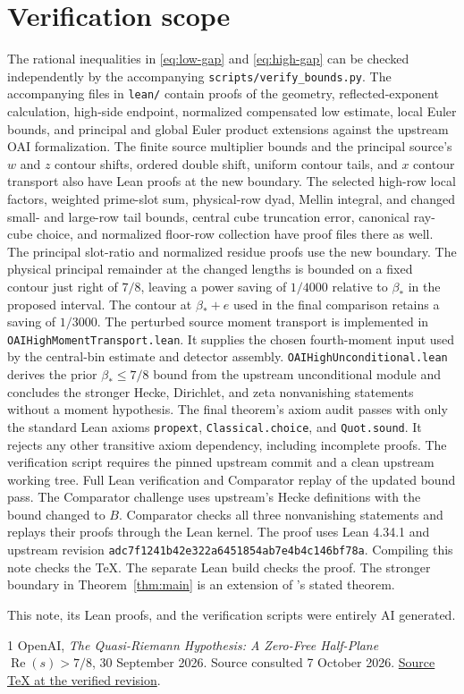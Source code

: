 \documentclass[11pt]{article}
\newcommand{\Ree}{\operatorname{Re}}
\begin{document}
\section*{Verification scope}

The rational inequalities in \eqref{eq:low-gap} and \eqref{eq:high-gap}
can be checked independently by the accompanying
\texttt{scripts/verify\_bounds.py}.
The accompanying files in \texttt{lean/} contain proofs of the geometry,
reflected-exponent calculation, high-side endpoint, normalized compensated
low estimate, local Euler bounds, and principal and global Euler product
extensions against the upstream OAI formalization.
The finite source multiplier bounds and
the principal source's $w$ and $z$ contour shifts, ordered double shift,
uniform contour tails, and $x$ contour transport also have Lean proofs at
the new boundary. The selected high-row local factors, weighted prime-slot
sum, physical-row dyad, Mellin integral, and changed small- and large-row
tail bounds, central cube truncation error, canonical ray-cube choice, and
normalized floor-row collection have proof files there as well.
The principal slot-ratio and normalized residue proofs use the
new boundary. The physical principal remainder at the changed lengths is
bounded on a fixed contour just right of $7/8$, leaving a power saving of
$1/4000$ relative to $\beta_*$ in the proposed interval. The contour at
$\beta_*+e$ used in the final comparison retains a saving of $1/3000$.
The perturbed source moment transport is implemented in
\texttt{OAIHighMomentTransport.lean}. It supplies the chosen fourth-moment
input used by the central-bin estimate and detector assembly.
\texttt{OAIHighUnconditional.lean} derives the prior $\beta_*\le7/8$ bound
from the upstream unconditional module and concludes the stronger Hecke,
Dirichlet, and zeta nonvanishing statements without a moment hypothesis.
The final theorem's axiom audit passes with only the standard Lean axioms
\texttt{propext}, \texttt{Classical.choice}, and \texttt{Quot.sound}.
It rejects any other transitive axiom dependency, including incomplete proofs.
The verification script requires the pinned upstream commit and a clean
upstream working tree.
Full Lean verification and Comparator replay of the updated bound pass.
The Comparator challenge uses upstream's Hecke definitions with the
bound changed to $B$. Comparator checks all three nonvanishing statements
and replays their proofs through the Lean kernel.
The proof uses Lean 4.34.1 and upstream revision
\texttt{adc7f1241b42e322a6451854ab7e4b4c146bf78a}.
Compiling this note checks the TeX. The separate Lean build checks the proof.
The stronger boundary in Theorem~\ref{thm:main} is an extension of
\cite{OAI}'s stated theorem.

This note, its Lean proofs, and the verification scripts were entirely
AI generated.

\begin{thebibliography}{1}
OpenAI, \emph{The Quasi-Riemann Hypothesis: A Zero-Free Half-Plane
$\Ree(s)>7/8$}, 30 September 2026. Source consulted 7 October 2026.
\href{https://github.com/openai/math/blob/adc7f1241b42e322a6451854ab7e4b4c146bf78a/preprints/The-Quasi-Riemann-Hypothesis-September-30-2026/build/paper.tex}{Source TeX at the verified revision}.
\end{thebibliography}
\end{document}
